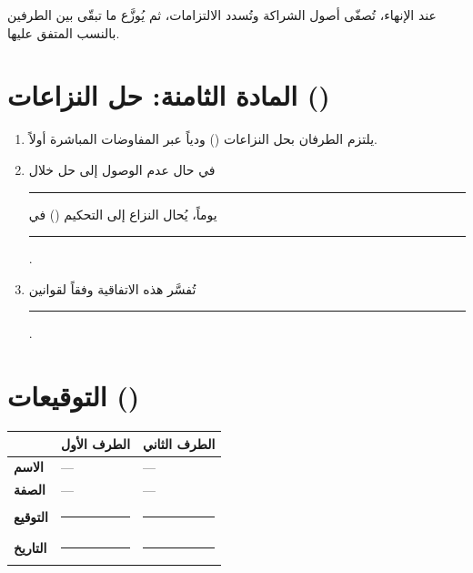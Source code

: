 \documentclass[12pt,a4paper]{article}
\begin{document}
\noindent عند الإنهاء، تُصفّى أصول الشراكة وتُسدد الالتزامات، ثم يُوزَّع ما تبقّى بين الطرفين بالنسب المتفق عليها.

\section{المادة الثامنة: حل النزاعات ()}
\label{sec:dispute}
\begin{enumerate}
    \item يلتزم الطرفان بحل النزاعات () ودياً عبر المفاوضات المباشرة أولاً.
    \item في حال عدم الوصول إلى حل خلال \rule{2cm}{0.4pt} يوماً، يُحال النزاع إلى التحكيم () في \rule{4cm}{0.4pt}.
    \item تُفسَّر هذه الاتفاقية وفقاً لقوانين \rule{5cm}{0.4pt}.
\end{enumerate}

\vspace{2em}
\section*{التوقيعات ()}

\begin{table}[H]
\centering
\renewcommand{\arraystretch}{2.5}
\begin{tabularx}{\textwidth}{L{5cm} X X}
\toprule
& \textbf{الطرف الأول} & \textbf{الطرف الثاني} \\
\midrule
\textbf{الاسم} & --- & --- \\
\textbf{الصفة} & --- & --- \\
\textbf{التوقيع} & \rule{4cm}{0.4pt} & \rule{4cm}{0.4pt} \\
\textbf{التاريخ} & \rule{4cm}{0.4pt} & \rule{4cm}{0.4pt} \\
\bottomrule
\end{tabularx}
\end{table}
\end{document}
